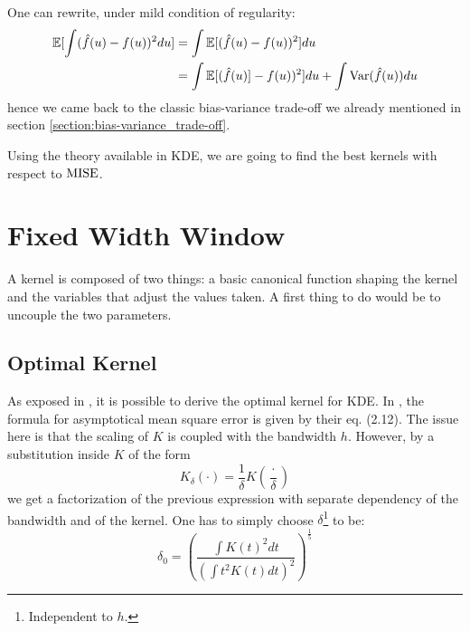 \documentclass[11pt]{book}
\begin{document}
\begin{remarque}
One can rewrite, under mild condition of regularity:
\begin{align*}
\mathbb E [ \int ( \hat{f}(u) - f(u) )^2 du ] &= \int \mathbb E [( \hat{f}(u) - f(u) )^2 ] du \\
&= \int  \mathbb E[ (\hat{f}(u) ] - f(u) )^2 ] du + \int \mathrm{Var}( \hat{f}(u)) du 
\end{align*}
hence we came back to the classic bias-variance trade-off we already mentioned in section \ref{section:bias-variance_trade-off}.
\end{remarque}

Using the theory available in KDE, we are going to find the best kernels with respect to $\operatorname{MISE}$.

\section{Fixed Width Window}
\label{section:FWW}

A kernel is composed of two things: a basic canonical function shaping the kernel and the variables that adjust the values taken. A first thing to do would be to uncouple the two parameters.

\subsection{Optimal Kernel}

As exposed in \cite{Wand}, it is possible to derive the optimal kernel for KDE. In \cite{Wand}, the formula for asymptotical mean square error is given by their eq. (2.12). The issue here is that the scaling of $K$ is coupled with the bandwidth $h$. However, by a substitution inside $K$ of the form 
$$ K_{\delta} ( \cdot ) = \frac 1  {\delta } K \left ( \frac {\cdot } { \delta } \right ) $$
we get a factorization of the previous expression with separate dependency of the bandwidth and of the kernel. One has to simply choose $\delta$\footnote{Independent to $h$.} to be: $$ \delta_0 = \left ( \frac{ \int K(t)^2 dt }{ \left ( \int t^2 K(t) dt \right )^2 } \right ) ^{\frac 1 5} $$
\end{document}
